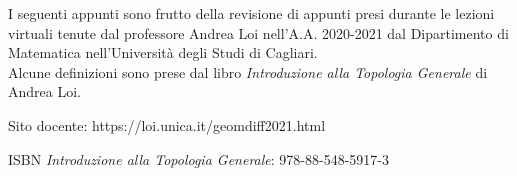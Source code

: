 I seguenti appunti sono frutto della revisione di appunti presi durante le lezioni virtuali tenute dal professore Andrea Loi nell'A.A. 2020-2021 dal Dipartimento di Matematica nell'Università degli Studi di Cagliari.\\
Alcune definizioni sono prese dal libro \textit{Introduzione alla Topologia Generale} di Andrea Loi.

Sito docente: https://loi.unica.it/geomdiff2021.html

ISBN \textit{Introduzione alla Topologia Generale}: 978-88-548-5917-3